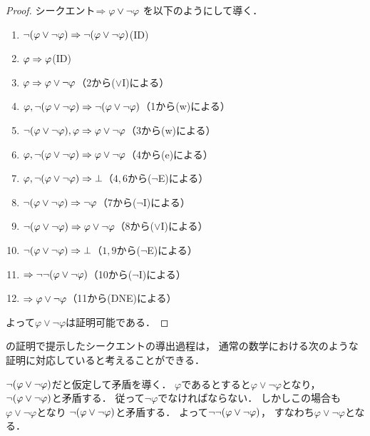 \begin{proof}
	シークエント\(\Rightarrow \varphi \lor \lnot \varphi\)
	を以下のようにして導く．
	\begin{enumerate}
		\item \(\lnot \paren{\varphi \lor \lnot \varphi} \sequent \lnot \paren{\varphi \lor \lnot \varphi}\)\quad (ID)
		\item \(\varphi \Rightarrow \varphi\)\quad (ID)
		\item \(\varphi \Rightarrow \varphi \lor \lnot \varphi\)\quad （2から(\(\lor\)I)による）
		\item \(\varphi, \lnot \paren{\varphi \lor \lnot \varphi} \sequent \lnot \paren{\varphi \lor \lnot \varphi}\)\quad （1から(w)による）
		\item \(\lnot \paren{\varphi \lor \lnot \varphi}, \varphi \sequent \varphi \lor \lnot \varphi\)\quad （3から(w)による）
		\item \(\varphi,\lnot \paren{\varphi \lor \lnot \varphi} \sequent \varphi \lor \lnot \varphi\)\quad （4から(e)による）
		\item \(\varphi, \lnot \paren{\varphi \lor \lnot \varphi} \sequent \bot\)\quad （\(4,6\)から(\(\lnot\)E)による）
		\item \(\lnot \paren{\varphi \lor \lnot \varphi} \sequent \lnot \varphi\)\quad （7から(\(\lnot\)I)による）
		\item \(\lnot \paren{\varphi \lor \lnot \varphi} \sequent \varphi \lor \lnot \varphi\)\quad （8から(\(\lor\)I)による）
		\item \(\lnot \paren{\varphi \lor \lnot \varphi} \sequent \bot\)\quad （\(1,9\)から(\(\lnot\)E)による）
		\item \(\sequent \lnot \lnot \paren{\varphi \lor \lnot \varphi}\)\quad （10から(\(\lnot\)I)による）
		\item \(\Rightarrow \varphi \lor \lnot \varphi\)\quad （11から(DNE)による）
	\end{enumerate}
	よって\(\varphi \lor \lnot \varphi\)は証明可能である．
\end{proof}

の証明で提示したシークエントの導出過程は，
通常の数学における次のような証明に対応していると考えることができる．

\begin{naiveproof}
	\(\lnot \paren{\varphi \lor \lnot \varphi}\)だと仮定して矛盾を導く．
	\(\varphi\)であるとすると\(\varphi \lor \lnot \varphi\)となり，
	\(\lnot \paren{\varphi \lor \lnot \varphi}\)と矛盾する．
	従って\(\lnot \varphi\)でなければならない．
	しかしこの場合も\(\varphi \lor \lnot \varphi\)となり
	\(\lnot \paren{\varphi \lor \lnot \varphi}\)と矛盾する．
	よって\(\lnot \lnot \paren{\varphi \lor \lnot \varphi}\)，
	すなわち\(\varphi \lor \lnot \varphi\)となる．
\end{naiveproof}

